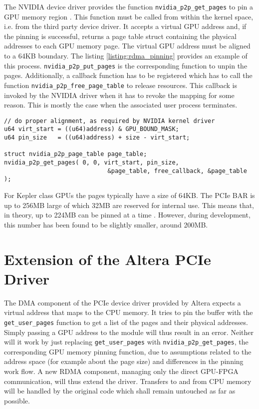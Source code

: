 The NVIDIA device driver provides the function \texttt{nvidia\_p2p\_get\_pages} to pin a GPU memory region \cite{rdma}.
This function must be called from within the kernel space, i.e. from the third party device driver.
It accepts a virtual GPU address and, if the pinning is successful, returns a page table struct containing the physical addresses to each GPU memory page.
The virtual GPU address must be aligned to a 64KB boundary.
The listing \ref{listing:rdma_pinning} provides an example of this process.
\texttt{nvidia\_p2p\_put\_pages} is the corresponding function to unpin the pages.
Additionally, a callback function has to be registered which has to call the function \texttt{nvidia\_p2p\_free\_page\_table} to release resources.
This callback is invoked by the NVIDIA driver when it has to revoke the mapping for some reason.
This is mostly the case when the associated user process terminates.


\begin{lstlisting}[label=listing:rdma_pinning, caption=Pinning GPU memory \cite{rdma}, morekeywords={nvidia_p2p_get_pages}]
// do proper alignment, as required by NVIDIA kernel driver 
u64 virt_start = ((u64)address) & GPU_BOUND_MASK;
u64 pin_size   = ((u64)address) + size - virt_start;

struct nvidia_p2p_page_table page_table;
nvidia_p2p_get_pages( 0, 0, virt_start, pin_size, 
                             &page_table, free_callback, &page_table ); 
\end{lstlisting}

For Kepler class GPUs the pages typically have a size of 64KB.
The PCIe BAR is up to 256MB large of which 32MB are reserved for internal use.
This means that, in theory, up to 224MB can be pinned at a time \cite{rdma}.
However, during development, this number has been found to be slightly smaller, around 200MB.

\section{Extension of the Altera PCIe Driver}


The DMA component of the PCIe device driver provided by Altera expects a virtual address that maps to the CPU memory.
It tries to pin the buffer with the \texttt{get\_user\_pages} function to get a list of the pages and their physical addresses.
Simply passing a GPU address to the module will thus result in an error.
Neither will it work by just replacing \texttt{get\_user\_pages} with  \texttt{nvidia\_p2p\_get\_pages}, the corresponding GPU memory pinning function, due to assumptions related to the address space (for example about the page size) and differences in the pinning work flow.
A new RDMA component, managing only the direct GPU-FPGA communication, will thus extend the driver.
Transfers to and from CPU memory will be handled by the original code which shall remain untouched as far as possible.

